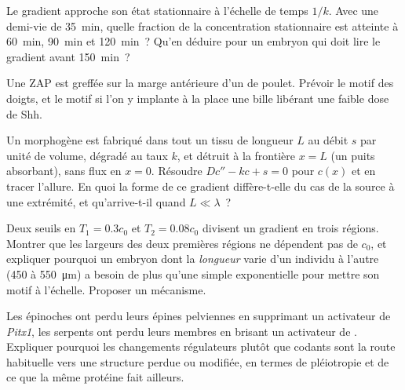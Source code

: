 \begin{exercise}[$\star\star$]\label{exo:b3:developmental-genetics:8}
Le gradient approche son état stationnaire à l'échelle de temps $1/k$.
Avec une demi-vie de \qty{35}{min}, quelle fraction de la concentration
stationnaire est atteinte à \qty{60}{min}, \qty{90}{min} et
\qty{120}{min}~? Qu'en déduire pour un embryon qui doit lire le gradient
avant \qty{150}{min}~?
\end{exercise}

\begin{exercise}[$\star\star$]\label{exo:b3:developmental-genetics:9}
Une ZAP est greffée sur la marge antérieure d'un  de
poulet. Prévoir le motif des doigts, et le motif si l'on y implante à la
place une bille libérant une faible dose de Shh.
\end{exercise}

\begin{exercise}[$\star\star\star$]\label{exo:b3:developmental-genetics:10}
Un morphogène est fabriqué dans tout un tissu de longueur $L$ au débit
$s$ par unité de volume, dégradé au taux $k$, et détruit à la frontière
$x =
L$ (un puits absorbant), sans flux en $x = 0$. Résoudre $Dc'' - kc + s =
0$ pour $c(x)$ et en tracer l'allure. En quoi la forme de ce gradient
diffère-t-elle du cas de la source à une extrémité, et qu'arrive-t-il
quand $L \ll \lambda$~?
\end{exercise}

\begin{exercise}[$\star\star\star$]\label{exo:b3:developmental-genetics:11}
Deux seuils en $T_{1} = 0.3c_{0}$ et $T_{2} = 0.08c_{0}$ divisent un
gradient en trois régions. Montrer que les largeurs des deux premières
régions ne dépendent pas de $c_{0}$, et expliquer pourquoi un embryon
dont la \emph{longueur} varie d'un individu à l'autre (\qty{450}{} à
\qty{550}{\micro m}) a besoin de plus qu'une simple exponentielle pour
mettre son motif à l'échelle. Proposer un mécanisme.
\end{exercise}

\begin{exercise}[$\star\star\star$]\label{exo:b3:developmental-genetics:12}
Les épinoches ont perdu leurs épines pelviennes en supprimant un
activateur de \emph{Pitx1}, les serpents ont perdu leurs membres en
brisant un activateur de \emph{}. Expliquer pourquoi les
changements régulateurs plutôt que codants sont la route habituelle vers
une structure perdue ou modifiée, en termes de pléiotropie et de ce que
la même protéine fait ailleurs.
\end{exercise}

